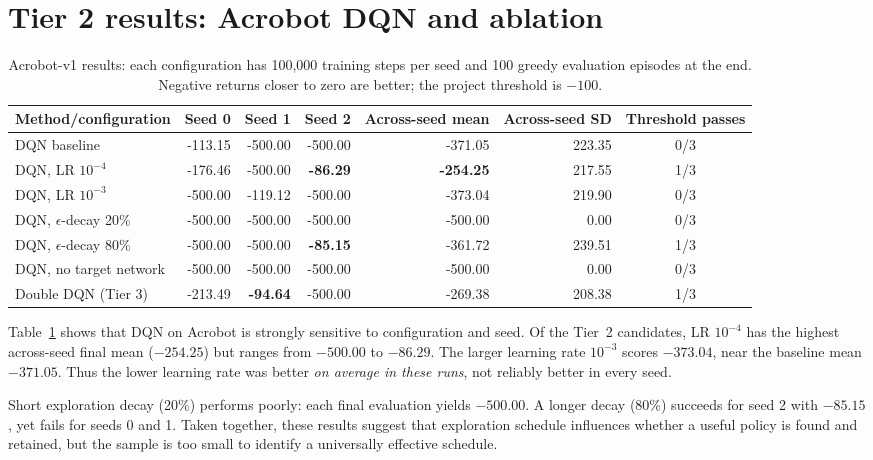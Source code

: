 \documentclass[a4paper,10pt,twocolumn]{article}
\begin{document}
\section{Tier 2 results: Acrobot DQN and ablation}
\begin{table}[t]
\centering\small
\caption{Acrobot-v1 results: each configuration has 100,000 training steps per seed and 100 greedy evaluation episodes at the end. Negative returns closer to zero are better; the project threshold is $-100$.}
\label{tab:acrobot}
\begin{tabular}{lrrrrrc}
\toprule
Method/configuration & Seed 0 & Seed 1 & Seed 2 & Across-seed mean & Across-seed SD & Threshold passes \\
\midrule
DQN baseline & -113.15 & -500.00 & -500.00 & -371.05 & 223.35 & 0/3 \\
DQN, LR $10^{-4}$ & -176.46 & -500.00 & \textbf{-86.29} & \textbf{-254.25} & 217.55 & 1/3 \\
DQN, LR $10^{-3}$ & -500.00 & -119.12 & -500.00 & -373.04 & 219.90 & 0/3 \\
DQN, $\epsilon$-decay 20\% & -500.00 & -500.00 & -500.00 & -500.00 & 0.00 & 0/3 \\
DQN, $\epsilon$-decay 80\% & -500.00 & -500.00 & \textbf{-85.15} & -361.72 & 239.51 & 1/3 \\
DQN, no target network & -500.00 & -500.00 & -500.00 & -500.00 & 0.00 & 0/3 \\
\midrule
Double DQN (Tier 3) & -213.49 & \textbf{-94.64} & -500.00 & -269.38 & 208.38 & 1/3 \\
\bottomrule
\end{tabular}
\end{table}

Table~\ref{tab:acrobot} shows that DQN on Acrobot is strongly sensitive to configuration and seed. Of the Tier~2 candidates, LR $10^{-4}$ has the highest across-seed final mean ($-254.25$) but ranges from $-500.00$ to $-86.29$. The larger learning rate $10^{-3}$ scores $-373.04$, near the baseline mean $-371.05$. Thus the lower learning rate was better \emph{on average in these runs}, not reliably better in every seed.

Short exploration decay (20\%) performs poorly: each final evaluation yields $-500.00$. A longer decay (80\%) succeeds for seed 2 with $-85.15$, yet fails for seeds 0 and 1. Taken together, these results suggest that exploration schedule influences whether a useful policy is found and retained, but the sample is too small to identify a universally effective schedule.
\end{document}
